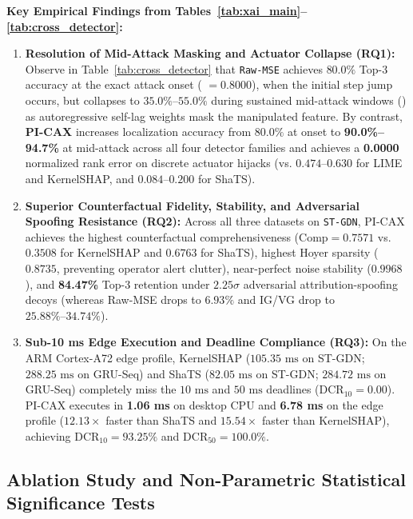 \documentclass[10pt,a4paper]{article}
\begin{document}
\textbf{Key Empirical Findings from Tables~\ref{tab:xai_main}--\ref{tab:cross_detector}:}
\begin{enumerate}\setlength{\itemsep}{2pt}\setlength{\parskip}{0pt}
    \item \textbf{Resolution of Mid-Attack Masking and Actuator Collapse (RQ1):} Observe in Table~\ref{tab:cross_detector} that \texttt{Raw-MSE} achieves $80.0\%$ Top-3 accuracy at the exact attack onset ( $= 0.8000$), when the initial step jump occurs, but collapses to $35.0\%\text{--}55.0\%$ during sustained mid-attack windows () as autoregressive self-lag weights mask the manipulated feature. By contrast, \textbf{PI-CAX} increases localization accuracy from $80.0\%$ at onset to \textbf{90.0\%--94.7\%} at mid-attack across all four detector families and achieves a \textbf{0.0000} normalized rank error on discrete actuator hijacks (vs. $0.474\text{--}0.630$ for LIME and KernelSHAP, and $0.084\text{--}0.200$ for ShaTS).
    \item \textbf{Superior Counterfactual Fidelity, Stability, and Adversarial Spoofing Resistance (RQ2):} Across all three datasets on \texttt{ST-GDN}, PI-CAX achieves the highest counterfactual comprehensiveness ($\text{Comp} = 0.7571$ vs. $0.3508$ for KernelSHAP and $0.6763$ for ShaTS), highest Hoyer sparsity ($0.8735$, preventing operator alert clutter), near-perfect noise stability ($0.9968$), and \textbf{84.47\%} Top-3 retention under $2.25\sigma$ adversarial attribution-spoofing decoys (whereas Raw-MSE drops to $6.93\%$ and IG/VG drop to $25.88\%\text{--}34.74\%$).
    \item \textbf{Sub-10 ms Edge Execution and Deadline Compliance (RQ3):} On the ARM Cortex-A72 edge profile, KernelSHAP ($105.35\text{ ms}$ on ST-GDN; $288.25\text{ ms}$ on GRU-Seq) and ShaTS ($82.05\text{ ms}$ on ST-GDN; $284.72\text{ ms}$ on GRU-Seq) completely miss the $10\text{ ms}$ and $50\text{ ms}$ deadlines ($\text{DCR}_{10} = 0.00$). PI-CAX executes in \textbf{1.06 ms} on desktop CPU and \textbf{6.78 ms} on the edge profile ($12.13\times$ faster than ShaTS and $15.54\times$ faster than KernelSHAP), achieving $\text{DCR}_{10} = 93.25\%$ and $\text{DCR}_{50} = 100.0\%$.
\end{enumerate}

\subsection{Ablation Study and Non-Parametric Statistical Significance Tests}
\end{document}
